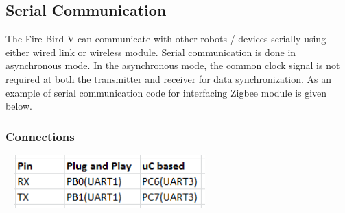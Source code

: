 \documentclass[a4paper,10pt,oneside]{article}
\begin{document}
						
		\subsection{\huge \textbf{Serial Communication}}
			{The Fire Bird V can communicate with other robots / devices serially using either wired link or wireless module. Serial  communication is done in asynchronous mode. In the asynchronous mode, the common clock signal is not required at both the transmitter  and receiver  for data synchronization. As an example of serial communication code for interfacing Zigbee module is given below.}\\
			
			\subsubsection{Connections}
				\begin{center}
					\includegraphics[width=8cm, height=2cm]{Serial}
				\end{center}
\end{document}
